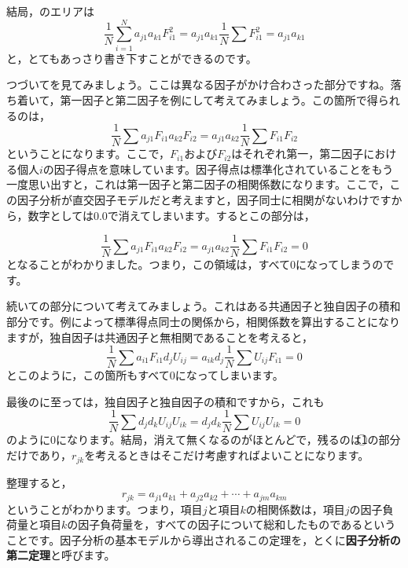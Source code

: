 \documentclass{ltjsbook}
\begin{document}
結局，のエリアは
\begin{equation}
	\frac{1}{N}\sum_{i=1}^{N}a_{j1}a_{k1}F_{i1}^2=a_{j1}a_{k1}\frac{1}{N}\sum F_{i1}^2=a_{j1}a_{k1}
\end{equation}
と，とてもあっさり書き下すことができるのです。

つづいてを見てみましょう。ここは異なる因子がかけ合わさった部分ですね。落ち着いて，第一因子と第二因子を例にして考えてみましょう。この箇所で得られるのは，
\begin{equation}
	\frac{1}{N}\sum a_{j1}F_{i1} a_{k2}F_{i2} = a_{j1}a_{k2}\frac{1}{N}\sum F_{i1}F_{i2}
\end{equation}
ということになります。ここで，$F_{i1}$および$F_{i2}$はそれぞれ第一，第二因子における個人$i$の因子得点を意味しています。因子得点は標準化されていることをもう一度思い出すと，これは第一因子と第二因子の相関係数になります。ここで，この因子分析が直交因子モデルだと考えますと，因子同士に相関がないわけですから，数字としては$0.0$で消えてしまいます。するとこの部分は，

\begin{equation}
	\frac{1}{N}\sum a_{j1}F_{i1} a_{k2}F_{i2} = a_{j1}a_{k2}\frac{1}{N}\sum F_{i1}F_{i2}=0
\end{equation}
となることがわかりました。つまり，この領域は，すべて$0$になってしまうのです。


続いての部分について考えてみましょう。これはある共通因子と独自因子の積和部分です。例によって標準得点同士の関係から，相関係数を算出することになりますが，独自因子は共通因子と無相関であることを考えると，
\begin{equation}
	\frac{1}{N}\sum a_{i1}F_{i1}d_{j}U_{ij}=a_{ik}d_{j} \frac{1}{N}\sum U_{ij}F_{i1} =0
\end{equation}
とこのように，この箇所もすべて$0$になってしまいます。

最後のに至っては，独自因子と独自因子の積和ですから，これも
\begin{equation}
	\frac{1}{N}\sum d_{j}d_{k}U_{ij}U_{ik}=d_{j}d_{k}\frac{1}{N}\sum U_{ij}U_{ik}=0
\end{equation}
のように$0$になります。結局，消えて無くなるのがほとんどで，残るのは\textcircled{1}の部分だけであり，$r_{jk}$を考えるときはそこだけ考慮すればよいことになります。

整理すると，
\begin{equation}
	r_{jk}=a_{j1}a_{k1}+a_{j2}a_{k2}+ \cdots +a_{jm}a_{km}
\end{equation}
ということがわかります。つまり，項目$j$と項目$k$の相関係数は，項目$j$の因子負荷量と項目$k$の因子負荷量を，すべての因子について総和したものであるということです。因子分析の基本モデルから導出されるこの定理を，とくに\textbf{因子分析の第二定理}と呼びます。
\end{document}
